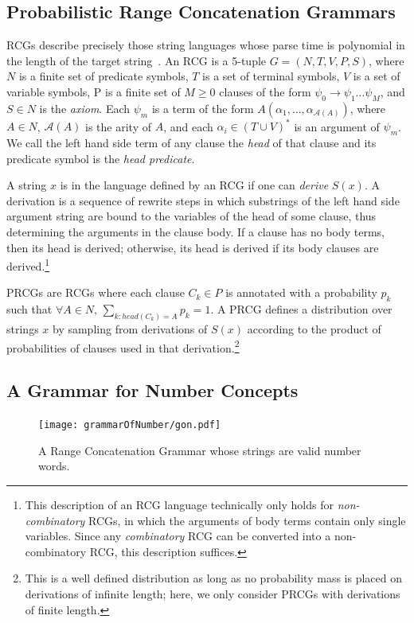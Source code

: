 \documentclass[10pt,letterpaper]{article}
\begin{document}
\subsection{Probabilistic Range Concatenation Grammars}

RCGs describe precisely those string languages whose parse time is
polynomial in the length of the target
string~\citep{boullier2005range}. An RCG is a 5-tuple $G=(N, T, V, P,
S)$, where $N$ is a finite set of predicate symbols, $T$ is a set of
terminal symbols, $V$ is a set of variable symbols, P is a finite set
of $M \geq 0$ clauses of the form $\psi_0 \rightarrow \psi_1 \dots
\psi_M$, and $S \in N$ is the \emph{axiom}. Each $\psi_m$ is a term of
the form $A(\alpha_1, \dots, \alpha_{\mathcal{A}(A)})$, where $A \in
N$, $\mathcal{A}(A)$ is the arity of $A$, and each $\alpha_i \in (T
\cup V)^*$ is an argument of $\psi_m$. We call the left hand side term
of any clause the \emph{head} of that clause and its predicate symbol
is the \emph{head predicate}.

A string $x$ is in the language defined by an RCG if one can
\emph{derive} $S(x)$. A derivation is a sequence of rewrite steps in
which substrings of the left hand side argument string are bound to
the variables of the head of some clause, thus determining the
arguments in the clause body. If a clause has no body terms, then its
head is derived; otherwise, its head is derived if its body clauses
are derived.\footnote{This description of an RCG language technically
  only holds for \emph{non-combinatory} RCGs, in which the arguments
  of body terms contain only single variables. Since any
  \emph{combinatory} RCG can be converted into a non-combinatory RCG,
  this description suffices.}

PRCGs are RCGs where each clause $C_k \in P$ is annotated with
a probability $p_k$ such that ${\forall A \in N, \,
  \sum_{k:head(C_k)=A} p_k = 1}$. A PRCG defines a distribution over
strings $x$ by sampling from derivations of $S(x)$ according to the
product of probabilities of clauses used in that derivation.\footnote{This is a
well defined distribution as long as no probability mass is placed on
derivations of infinite length; here, we only consider PRCGs with
derivations of finite length.}

\subsection{A Grammar for Number Concepts}

\begin{figure}[t]
  \begin{centering}
    \texttt{[image: grammarOfNumber/gon.pdf]}
    \caption{A Range Concatenation Grammar whose strings are valid number words.}
    \label{fig:gon}
  \end{centering}
\end{figure}
\end{document}
